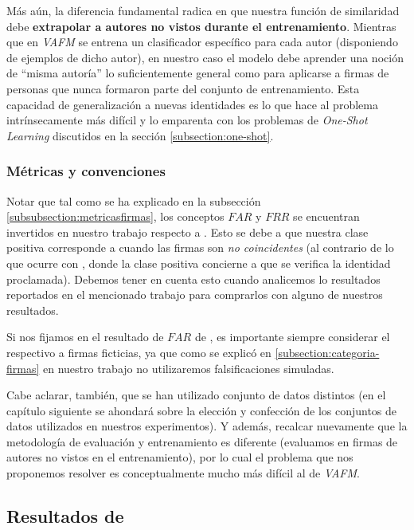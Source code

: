 Más aún, la diferencia fundamental radica en que nuestra función de similaridad debe \textbf{extrapolar a autores no vistos durante el entrenamiento}. Mientras que en \textit{VAFM} se entrena un clasificador específico para cada autor (disponiendo de ejemplos de dicho autor), en nuestro caso el modelo debe aprender una noción de ``misma autoría'' lo suficientemente general como para aplicarse a firmas de personas que nunca formaron parte del conjunto de entrenamiento. Esta capacidad de generalización a nuevas identidades es lo que hace al problema intrínsecamente más difícil y lo emparenta con los problemas de \textit{One-Shot Learning} discutidos en la sección \ref{subsection:one-shot}.

\subsubsection{Métricas y convenciones}

Notar que tal como se ha explicado en la subsección \ref{subsubsection:metricasfirmas}, los conceptos $FAR$ y $FRR$ se encuentran invertidos en nuestro trabajo respecto a \cite{tesis-parodi}. Esto se debe a que nuestra clase positiva corresponde a cuando las firmas son \textit{no coincidentes} (al contrario de lo que ocurre con \cite{tesis-parodi}, donde la clase positiva concierne a que se verifica la identidad proclamada). Debemos tener en cuenta esto cuando analicemos lo resultados reportados en el mencionado trabajo para comprarlos con alguno de nuestros resultados.

Si nos fijamos en el resultado de $FAR$ de \cite{tesis-parodi}, es importante siempre considerar el respectivo a firmas ficticias, ya que como se explicó en \ref{subsection:categoria-firmas} en nuestro trabajo no utilizaremos falsificaciones simuladas.

Cabe aclarar, también, que se han utilizado conjunto de datos distintos (en el capítulo siguiente se ahondará sobre la elección y confección de los conjuntos de datos utilizados en nuestros experimentos). Y además, recalcar nuevamente que la metodología de evaluación y entrenamiento es diferente (evaluamos en firmas de autores no vistos en el entrenamiento), por lo cual el problema que nos proponemos resolver es conceptualmente mucho más difícil al de \textit{VAFM}.

\subsection{Resultados de \cite{tesis-parodi}}


